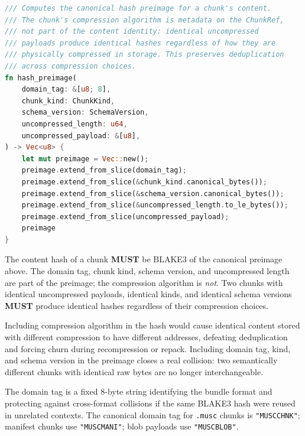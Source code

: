 \documentclass[11pt,letterpaper]{report}
\newcounter{requirement}[chapter]
\newcommand{\MUST}{\textbf{MUST}}
\begin{document}
\begin{lstlisting}[language=Rust]
/// Computes the canonical hash preimage for a chunk's content.
/// The chunk's compression algorithm is metadata on the ChunkRef,
/// not part of the content identity: identical uncompressed
/// payloads produce identical hashes regardless of how they are
/// physically compressed in storage. This preserves deduplication
/// across compression choices.
fn hash_preimage(
    domain_tag: &[u8; 8],
    chunk_kind: ChunkKind,
    schema_version: SchemaVersion,
    uncompressed_length: u64,
    uncompressed_payload: &[u8],
) -> Vec<u8> {
    let mut preimage = Vec::new();
    preimage.extend_from_slice(domain_tag);
    preimage.extend_from_slice(&chunk_kind.canonical_bytes());
    preimage.extend_from_slice(&schema_version.canonical_bytes());
    preimage.extend_from_slice(&uncompressed_length.to_le_bytes());
    preimage.extend_from_slice(uncompressed_payload);
    preimage
}
\end{lstlisting}

\begin{requirement}
  \label{req:format:domain-separated-chunk-hashes}
  The content hash of a chunk \MUST{} be BLAKE3 of the canonical
  preimage above. The domain tag, chunk kind, schema version, and
  uncompressed length are part of the preimage; the compression
  algorithm is \emph{not}. Two chunks with identical uncompressed
  payloads, identical kinds, and identical schema versions \MUST{}
  produce identical hashes regardless of their compression choices.
\end{requirement}

\begin{rationale}
  Including compression algorithm in the hash would cause
  identical content stored with different compression to have
  different addresses, defeating deduplication and forcing churn
  during recompression or repack. Including domain tag, kind, and
  schema version in the preimage closes a real collision: two
  semantically different chunks with identical raw bytes are no
  longer interchangeable.

  The domain tag is a fixed 8-byte string identifying the bundle
  format and protecting against cross-format collisions if the
  same BLAKE3 hash were reused in unrelated contexts. The canonical
  domain tag for \texttt{.musc} chunks is \texttt{"MUSCCHNK"};
  manifest chunks use \texttt{"MUSCMANI"}; blob payloads use
  \texttt{"MUSCBLOB"}.
\end{rationale}
\end{document}
